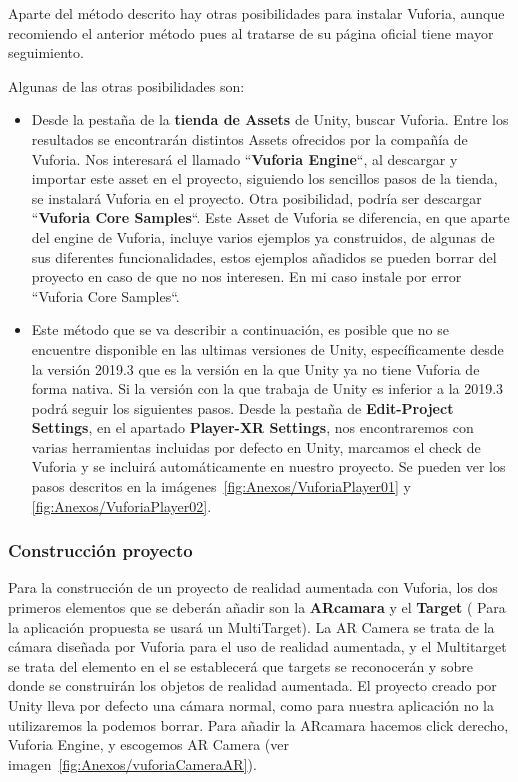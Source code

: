 Aparte del método descrito hay otras posibilidades para instalar Vuforia, aunque recomiendo el anterior método pues al tratarse de su página oficial tiene mayor seguimiento.

Algunas de las otras posibilidades son:
\begin{itemize}
	\item Desde la pestaña de la \textbf{tienda de Assets} de Unity, buscar Vuforia. Entre los resultados se encontrarán distintos Assets ofrecidos por la compañía de Vuforia. Nos interesará el llamado ``\textbf{Vuforia Engine}``, al descargar y importar este asset en el proyecto, siguiendo los sencillos pasos de la tienda, se instalará Vuforia en el proyecto.
	Otra posibilidad, podría ser descargar ``\textbf{Vuforia Core Samples}``. Este Asset de Vuforia se diferencia, en que aparte del engine de Vuforia, incluye varios ejemplos ya construidos, de algunas de sus diferentes funcionalidades, estos ejemplos añadidos se pueden borrar del proyecto en caso de que no nos interesen. En mi caso instale por error ``Vuforia Core Samples``.
	
	\item Este método que se va describir a continuación, es posible que no se encuentre disponible en las ultimas versiones de Unity, específicamente desde la versión 2019.3 que es la versión en la que Unity ya no tiene Vuforia de forma nativa. Si la versión con la que trabaja de Unity es inferior a la 2019.3 podrá seguir los siguientes pasos. Desde la pestaña de \textbf{Edit-Project Settings}, en el apartado \textbf{Player-XR Settings}, nos encontraremos con varias herramientas incluidas por defecto en Unity, marcamos el check de Vuforia y se incluirá automáticamente en nuestro proyecto. Se pueden ver los pasos descritos en la imágenes~\ref{fig:Anexos/VuforiaPlayer01} y \ref{fig:Anexos/VuforiaPlayer02}.
	
\end{itemize}



\subsubsection{Construcción proyecto}

Para la construcción de un proyecto de realidad aumentada con Vuforia, los dos primeros elementos que se deberán añadir son la \textbf{ARcamara} y el \textbf{Target} ( Para la aplicación propuesta se usará un MultiTarget). La AR Camera se trata de la cámara diseñada por Vuforia para el uso de realidad aumentada, y el Multitarget se trata del elemento en el se establecerá que targets se reconocerán y sobre donde se construirán los objetos de realidad aumentada.
El proyecto creado por Unity lleva por defecto una cámara normal, como para nuestra aplicación no la utilizaremos la podemos borrar.
Para añadir la ARcamara hacemos click derecho, Vuforia Engine, y escogemos AR Camera (ver imagen~\ref{fig:Anexos/vuforiaCameraAR}). 

